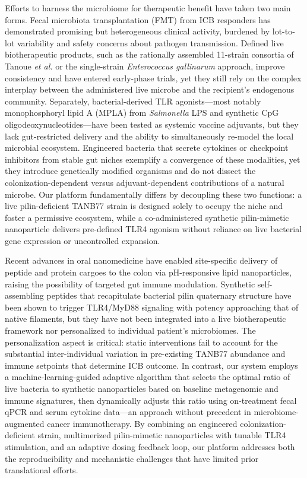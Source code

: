 \documentclass{article}
\begin{document}
Efforts to harness the microbiome for therapeutic benefit have taken two main forms. Fecal microbiota transplantation (FMT) from ICB responders has demonstrated promising but heterogeneous clinical activity, burdened by lot-to-lot variability and safety concerns about pathogen transmission\cite{baruch2021fmt,davar2021fmt}. Defined live biotherapeutic products, such as the rationally assembled 11-strain consortia of Tanoue \textit{et al.} or the single-strain \textit{Enterococcus gallinarum} approach, improve consistency and have entered early-phase trials, yet they still rely on the complex interplay between the administered live microbe and the recipient’s endogenous community\cite{tanoue2019defined,griffin2021enterococcus}. Separately, bacterial-derived TLR agonists—most notably monophosphoryl lipid A (MPLA) from \textit{Salmonella} LPS and synthetic CpG oligodeoxynucleotides—have been tested as systemic vaccine adjuvants, but they lack gut-restricted delivery and the ability to simultaneously re-model the local microbial ecosystem\cite{shepherd2018tlr}. Engineered bacteria that secrete cytokines or checkpoint inhibitors from stable gut niches exemplify a convergence of these modalities, yet they introduce genetically modified organisms and do not dissect the colonization-dependent versus adjuvant-dependent contributions of a natural microbe\cite{gurbatri2020engineered}. Our platform fundamentally differs by decoupling these two functions: a live pilin-deficient TANB77 strain is designed solely to occupy the niche and foster a permissive ecosystem, while a co-administered synthetic pilin-mimetic nanoparticle delivers pre-defined TLR4 agonism without reliance on live bacterial gene expression or uncontrolled expansion.

Recent advances in oral nanomedicine have enabled site-specific delivery of peptide and protein cargoes to the colon via pH-responsive lipid nanoparticles, raising the possibility of targeted gut immune modulation\cite{wang2019oral,chen2022phresponsive}. Synthetic self-assembling peptides that recapitulate bacterial pilin quaternary structure have been shown to trigger TLR4/MyD88 signaling with potency approaching that of native filaments\cite{smith2021synthetic}, but they have not been integrated into a live biotherapeutic framework nor personalized to individual patient’s microbiomes. The personalization aspect is critical: static interventions fail to account for the substantial inter-individual variation in pre-existing TANB77 abundance and immune setpoints that determine ICB outcome\cite{derosa2022gut,zhu2021adaptive}. In contrast, our system employs a machine-learning-guided adaptive algorithm that selects the optimal ratio of live bacteria to synthetic nanoparticles based on baseline metagenomic and immune signatures, then dynamically adjusts this ratio using on-treatment fecal qPCR and serum cytokine data—an approach without precedent in microbiome-augmented cancer immunotherapy. By combining an engineered colonization-deficient strain, multimerized pilin-mimetic nanoparticles with tunable TLR4 stimulation, and an adaptive dosing feedback loop, our platform addresses both the reproducibility and mechanistic challenges that have limited prior translational efforts.
\end{document}
